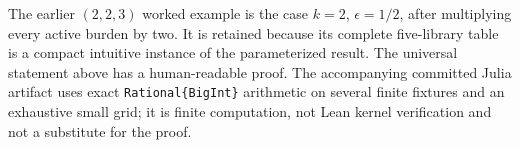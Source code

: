 The earlier \((2,2,3)\) worked example is the case \(k=2\),
\(\epsilon=1/2\), after multiplying every active burden by two.  It is
retained because its complete five-library table is a compact intuitive
instance of the parameterized result.  The universal statement above has a
human-readable proof.  The accompanying committed Julia artifact uses exact
\texttt{Rational\{BigInt\}} arithmetic on several finite fixtures and an
exhaustive small grid; it is finite computation, not Lean kernel verification
and not a substitute for the proof.
